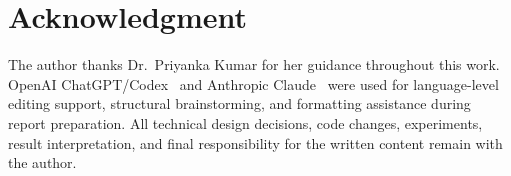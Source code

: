 \documentclass[conference]{IEEEtran}
\begin{document}
\section*{Acknowledgment}

The author thanks Dr.~Priyanka Kumar for her guidance throughout this work. OpenAI ChatGPT/Codex~\cite{openai2025chatgpt} and Anthropic Claude~\cite{anthropic2025claude} were used for language-level editing support, structural brainstorming, and formatting assistance during report preparation. All technical design decisions, code changes, experiments, result interpretation, and final responsibility for the written content remain with the author.

\end{document}
